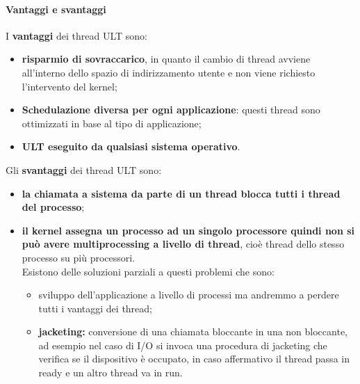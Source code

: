 \documentclass[12pt, letterpaper]{report}
\begin{document}
	\paragraph{Vantaggi e svantaggi}
	I \textbf{vantaggi} dei thread ULT sono:
	\begin{itemize}
		\item \textbf{risparmio di sovraccarico}, in quanto il cambio di thread avviene all'interno dello spazio di indirizzamento utente e non viene richiesto l'intervento del kernel;
		\item \textbf{Schedulazione diversa per ogni applicazione}: questi thread sono ottimizzati in base al tipo di applicazione;
		\item \textbf{ULT eseguito da qualsiasi sistema operativo}.
	\end{itemize}
	Gli \textbf{svantaggi} dei thread ULT sono:
	\begin{itemize}
		\item \textbf{la chiamata a sistema da parte di un thread blocca tutti i thread del processo};
		\item \textbf{il kernel assegna un processo ad un singolo processore quindi non si può avere multiprocessing a livello di thread}, cioè thread dello stesso processo su più processori. \\
		Esistono delle soluzioni parziali a questi problemi che sono:
		\begin{itemize}
			\item sviluppo dell'applicazione a livello di processi ma andremmo a perdere tutti i vantaggi dei thread;
			\item \textbf{jacketing:} conversione di una chiamata bloccante in una non bloccante, ad esempio nel caso di I/O si invoca una procedura di jacketing che verifica se il dispositivo è occupato, in caso affermativo il thread passa in ready e un altro thread va in run.
		\end{itemize}
	\end{itemize}
\end{document}
